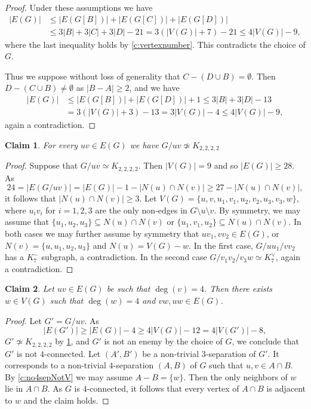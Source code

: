 \documentclass[reqno,final,12pt]{amsart}
\newtheorem{claim}{Claim}[section]
\begin{document}
{\begin{proof}
Under these assumptions 
we have \begin{align*}|E(G)| &\leq |E(G[B])|+|E(G[C])|+|E(G[D])| \\ &\leq 3|B|+3|C|+3|D|-21 = 3(|V(G)|+7)-21 \leq 4|V(G)|-9,\end{align*}
where the last inequality holds by \cref{c:vertexnumber}.
This contradicts the choice of $G$.

Thus we suppose without loss of generality that   $C - (D \cup B) = \emptyset$. Then  $D - (C \cup B) \neq \emptyset$ as $|B -A| \geq 2$, and we have 
 \begin{align*}|E(G)| &\leq  |E(G[B])|+|E(G[D])|+1 \leq 3|B|+3|D|-13 \\ & = 3(|V(G)|+3)-13 =  3|V(G)|-4 \leq 4|V(G)|-9,\end{align*}
again a contradiction.
\end{proof}

\begin{claim}\label{c:K2222}
For every $uv \in E(G)$  
we have	$G / uv \not \simeq K_{2,2,2,2}$ 
\end{claim}
\begin{proof} Suppose that 	$G / uv  \simeq K_{2,2,2,2}$. Then $|V(G)| =9$ and so $|E(G)| \geq 28$. 
As  $$24 = |E(G / uv)| = |E(G)| - 1 - |N(u) \cap N(v)|  \geq 27 - |N(u) \cap N(v)|,$$
it follows that   $|N(u) \cap N(v)| \geq 3$. Let $V(G)=\{u,v,u_1,v_1,u_2,v_2,u_3,v_3,w\}$, where $u_iv_i$ for $i=1,2,3$ are the only non-edges in $G \setminus u \setminus v$. By symmetry, we may assume that $\{u_1,u_2,u_3\}  \subseteq N(u) \cap N(v)$ or $\{u_1,v_1,u_2\} \subseteq N(u) \cap N(v)$. In both cases  we may further assume by symmetry that $uv_1,vv_2 \in E(G)$, or $N(v) = \{u,u_1,u_2,u_3\}$ and $N(u) = V(G) - w$. In the first case,  
$G /uu_1/vv_2$ has a $K^-_7$ subgraph, a contradiction. In the second case $G/v_1v_2/v_3w \simeq K^{\vee}_7$, again a contradiction.
\end{proof}	
	
\begin{claim}\label{c:degree4} Let $uv \in E(G)$ be such that $\deg(v) = 4$. Then there exists $w \in V(G)$ such that $\deg(w)=4$ and $vw, uw \in E(G)$. \end{claim}

\begin{proof} 
	Let $G'= G / uv$. As  $$|E(G')| \geq |E(G)| -4  \geq 4|V(G)|-12 =  4|V(G')|-8,$$  $G' \not \simeq K_{2,2,2,2}$ by \cref{c:K2222}, and $G'$ is not an enemy by the choice of $G$, we conclude that $G'$ is not $4$-connected. Let $(A',B')$ be a non-trivial $3$-separation of $G'$. It corresponds to a non-trivial $4$-separation $(A,B)$ of $G$ such that $u,v \in A \cap B$. By \cref{c:no4sepNotV} we may assume $A-B = \{w\}$. Then the only neighbors of $w$ lie in $A \cap B$. As $G$ is $4$-connected, it follows that every vertex of $A \cap B$ is adjacent to $w$ and the claim holds.
\end{proof}	 

}
\end{document}
